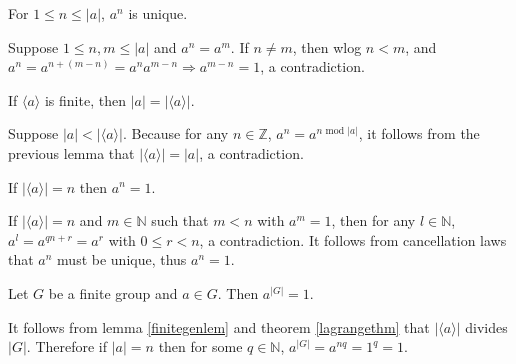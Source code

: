 \documentclass{article}
\begin{document}
\begin{lem}
	For \(1\leq n\leq\lvert a\rvert\), \(a^n\) is unique.
	\begin{IEEEproof}
		Suppose \(1\leq n,m\leq\lvert a\rvert\) and \(a^n=a^m\). If \(n\neq m\), then wlog \(n<m\), and \(a^n=a^{n+(m-n)}=a^na^{m-n}\Rightarrow a^{m-n}=1\), a contradiction.
	\end{IEEEproof}
\end{lem}
\begin{lem}
	\label{finitegenlem}
	If \(\langle a\rangle\) is finite, then \(\lvert a\rvert=\lvert\langle a\rangle\rvert\).
	\begin{IEEEproof}
		Suppose \(\lvert a\rvert<\lvert\langle a\rangle\rvert\). Because for any \(n\in\mathbb{Z}\), \(a^n=a^{n\text{ mod }\lvert a\rvert}\), it follows from the previous lemma that \(\lvert\langle a\rangle\rvert=\lvert a\rvert\), a contradiction.
	\end{IEEEproof}
\end{lem}
\begin{cor}
	If \(\lvert\langle a\rangle\rvert=n\) then \(a^n=1\).
	\begin{IEEEproof}
	If \(\lvert\langle a\rangle\rvert=n\) and \(m\in\mathbb{N}\) such that \(m<n\) with \(a^m=1\), then for any \(l\in\mathbb{N}\), \(a^{l}=a^{qn+r}=a^{r}\) with \(0\leq r<n\), a contradiction. It follows from cancellation laws that \(a^n\) must be unique, thus \(a^n=1\).
	\end{IEEEproof}
\end{cor}
\begin{lem}
	Let \(G\) be a finite group and \(a\in G\). Then \(a^{\lvert G\rvert}=1\).
	\begin{IEEEproof}
		It follows from lemma \ref{finitegenlem} and theorem \ref{lagrangethm} that \(\lvert\langle a\rangle\rvert\) divides \(\lvert G\rvert\). Therefore if \(\lvert a\rvert=n\) then for some \(q\in\mathbb{N}\), \(a^{\lvert G\rvert}=a^{nq}=1^{q}=1\).
	\end{IEEEproof}
\end{lem}
\end{document}
